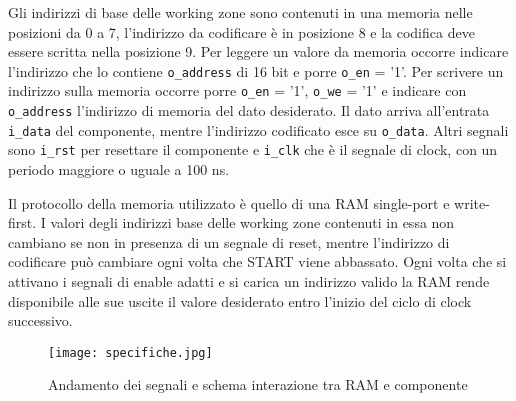 \documentclass [a4paper, 12pt]{article}
\begin{document}
Gli indirizzi di base delle working zone sono  contenuti in una memoria nelle posizioni da 0 a 7, l'indirizzo da codificare \`e in posizione 8 e la codifica deve essere scritta nella posizione 9. Per leggere un valore da memoria occorre indicare l'indirizzo che lo contiene \texttt{o\_address} di 16 bit e porre \texttt{o\_en} = '1'. Per scrivere un indirizzo sulla memoria occorre porre \texttt{o\_en} = '1', \texttt{o\_we} = '1' e indicare con \texttt{o\_address} l'indirizzo di memoria del dato desiderato. Il dato arriva all'entrata \texttt{i\_data} del componente, mentre l'indirizzo codificato esce su \texttt{o\_data}.
Altri segnali sono \texttt{i\_rst} per resettare il componente e \texttt{i\_clk} che \`e il segnale di clock, con un periodo maggiore o uguale a 100 ns.

Il protocollo della memoria utilizzato \`e quello di una RAM single-port e write-first. I valori degli indirizzi base delle working zone contenuti in essa non cambiano se non in presenza di un segnale di reset, mentre l'indirizzo di codificare pu\`o cambiare ogni volta che START viene abbassato. Ogni volta che si attivano i segnali di enable adatti e si carica un indirizzo valido la RAM rende disponibile alle sue uscite il valore desiderato entro l'inizio del ciclo di clock successivo.

\begin{figure}[htbp]
\begin{center}
\texttt{[image: specifiche.jpg]}
\end{center}
\caption{Andamento dei segnali e schema interazione tra RAM e componente}
\label{fig:figure2}
\end{figure}

%
%

\newpage
\end{document}
